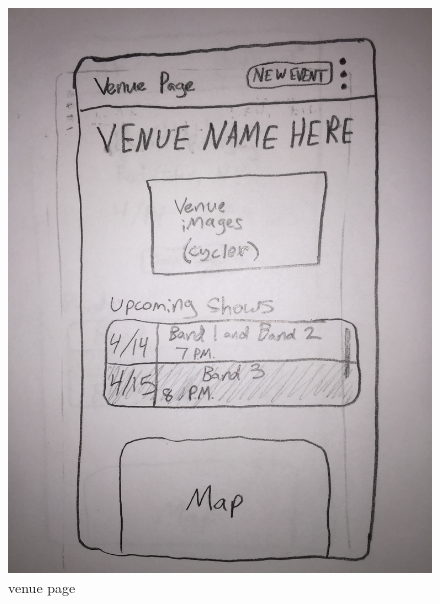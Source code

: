 \documentclass[a4paper]{article}
\begin{document}
\begin{figure}[H]
  \centering
  \begin{minipage}[b]{0.5\textwidth}
    \includegraphics[width=\textwidth]{venue_page.jpg}
    \caption{venue page}
  \end{minipage}
\end{figure}
\end{document}
